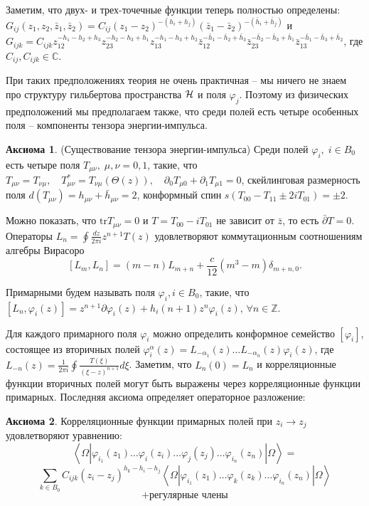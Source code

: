 \documentclass[a4paper,12pt]{article}
\theoremstyle{definition}
\newtheorem{axiom}{Аксиома}
\begin{document}
Заметим, что двух- и трех-точечные функции теперь полностью
определены:
$G_{ij}(z_1,z_2,\bar z_1, \bar z_2)=C_{ij} (z_1-z_2)^{-(h_i+h_j)}(\bar
z_1-\bar z_2)^{-(\bar h_i+\bar h_j)}$ и
$G_{ijk}=C_{ijk}z_{12}^{-h_1-h_2+h_3}
z_{23}^{-h_2-h_3+h_1}z_{13}^{-h_1-h_3+h_2} 
\bar z_{12}^{-\bar h_1-\bar h_2+\bar h_3} \bar z_{23}^{-\bar h_2-\bar
  h_3+\bar h_1}\bar z_{13}^{-\bar h_1-\bar h_3+\bar h_2}$, где
$C_{ij}, C_{ijk}\in \mathbb{C}$.

При таких предположениях теория не очень практичная -- мы ничего не
знаем про структуру гильбертова пространства ${\cal H}$ и поля
$\varphi_j$. Поэтому из физических предположений мы предполагаем
также, что среди полей есть четыре особенных поля -- компоненты
тензора энергии-импульса. 

\begin{axiom}
  (Существование тензора энергии-импульса)
  Среди полей $\varphi_{i},\; i\in B_{0}$ есть четыре поля
  $T_{\mu\nu},\; \mu,\nu=0,1$, такие, что $T_{\mu\nu}=T_{\nu\mu},\quad
  T_{\mu\nu}^{*}=T_{\nu\mu}(\Theta(z)),\quad \partial_{0} T_{\mu
    0}+\partial_{1}T_{\mu 1}=0$, скейлинговая размерность поля
  $d(T_{\mu\nu})=h_{\mu\nu}+\bar{h}_{\mu\nu}=2$,  конформный спин $s(T_{00}-T_{11}\pm 2i T_{01})=\pm 2$. 
\end{axiom}
Можно показать, что $\mathrm{tr} T_{\mu\nu}=0$ и $T=T_{00}-i T_{01}$ не зависит от $\bar z$, то есть $\bar \partial T=0$. Операторы $L_{n}=\oint \frac{dz}{2\pi i} z^{n+1} T(z)$
удовлетворяют коммутационным соотношениям алгебры Вирасоро 
$$ [L_m,L_n]=(m-n)L_{m+n}+\frac{c}{12}(m^3-m)\delta_{m+n,0}.$$

Примарными будем называть поля $\varphi_{i}, i\in B_{0}$, такие, что
$[L_{n}, \varphi_{i}(z)]=z^{n+1}\partial
\varphi_{i}(z)+h_{i}(n+1)z^{n}\varphi_{i}(z)$,  $\forall n\in\mathbb{Z}$.

Для каждого примарного поля $\varphi_{i}$ можно определить конформное
семейство $[\varphi_{i}]$, состоящее из вторичных полей
$\varphi_{i}^{\alpha}(z)=L_{-\alpha_{1}}(z)\dots
L_{-\alpha_{n}}(z)\varphi_{i}(z)$, где $L_{-n}(z)=\frac{1}{2\pi
  i}\oint\frac{T(\xi)}{(\xi-z)^{n+1}} d\xi$. Заметим, что
$L_{n}(0)=L_{n}$ и корреляционные функции вторичных полей могут быть
выражены через корреляционные функции примарных.  Последняя аксиома
определяет операторное разложение:
\begin{axiom}
Корреляционные функции примарных полей  при $z_{i}\to z_{j}$ удовлетворяют уравнению:
$$\left<\Omega|\varphi_{i_{1}}(z_{1})\dots\varphi_{i}(z_{i})\dots \varphi_{j}(z_{j})\dots \varphi_{i_{n}}(z_{n})|\Omega\right>=$$
$$  \sum_{k\in B_{0}}C_{ijk} (z_{i}-z_{j})^{h_{k}-h_{i}-h_{j}} \left<\Omega|\varphi_{i_{1}}(z_{1})\dots\varphi_{k}(z_{k})\dots \varphi_{i_{n}}(z_{n})|\Omega\right>$$
$$  +\mbox{регулярные члены}$$
\end{axiom}
\end{document}
